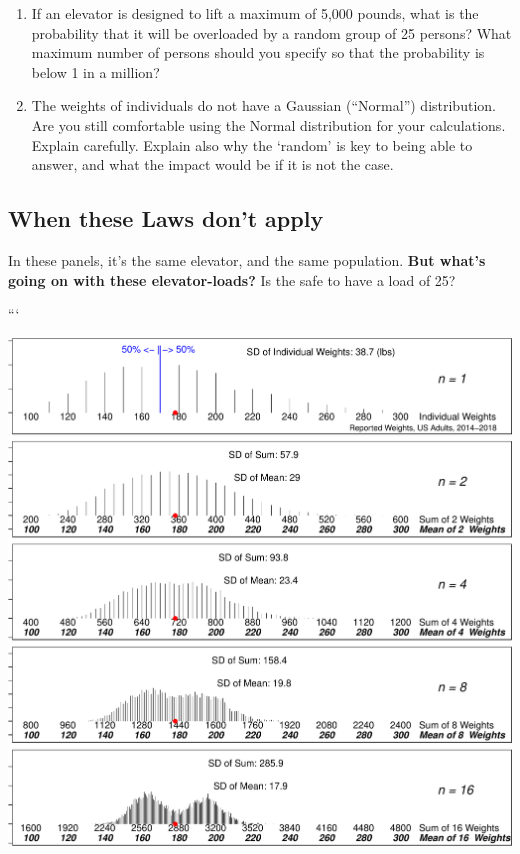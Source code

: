 \documentclass[
]{article}
\begin{document}
\begin{enumerate}
\def\labelenumi{\arabic{enumi}.}
\item
  If an elevator is designed to lift a maximum of 5,000 pounds, what is
  the probability that it will be overloaded by a random group of 25
  persons? What maximum number of persons should you specify so that the
  probability is below 1 in a million?
\item
  The weights of individuals do not have a Gaussian (``Normal'')
  distribution. Are you still comfortable using the Normal distribution
  for your calculations. Explain carefully. Explain also why the
  `random' is key to being able to answer, and what the impact would be
  if it is not the case.
\end{enumerate}

\hypertarget{when-these-laws-dont-apply}{%
\subsection{When these Laws don't
apply}\label{when-these-laws-dont-apply}}

In these panels, it's the same elevator, and the same population.
\textbf{But what's going on with these elevator-loads?} Is the safe to
have a load of 25?

```

\begin{center}\includegraphics{hanley-computing_files/figure-latex/unnamed-chunk-9-1} \end{center}
\end{document}
